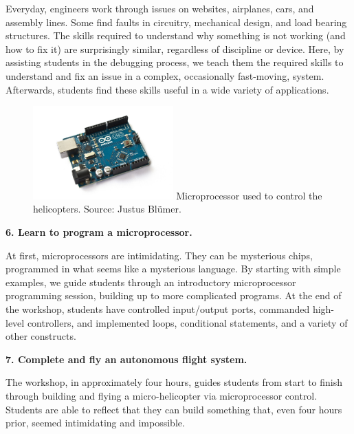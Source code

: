 \documentclass[11pt]{article}
\begin{document}
Everyday, engineers work through issues on websites, airplanes, cars, and assembly lines.  Some find faults in circuitry, mechanical design, and load bearing structures.  The skills required to understand why something is not working (and how to fix it) are surprisingly similar, regardless of discipline or device.  Here, by assisting students in the debugging process, we teach them the required skills to understand and fix an issue in a complex, occasionally fast-moving, system.  Afterwards, students find these skills useful in a wide variety of applications.

\vspace{20pt}
\begin{figure}
    \begin{center}
    \includegraphics[width=0.48\textwidth]{figures/arduino_uno.jpg}
    {\small Microprocessor used to control the helicopters.  Source: Justus Bl\"umer.}
    \end{center}
    \vspace{-30pt}
\end{figure}
\textbf{6. Learn to program a microprocessor.}

At first, microprocessors are intimidating.  They can be mysterious chips, programmed in what seems like a mysterious language.  By starting with simple examples, we guide students through an introductory microprocessor programming session, building up to more complicated programs.  At the end of the workshop, students have controlled input/output ports, commanded high-level controllers, and implemented loops, conditional statements, and a variety of other constructs. 

\newpage
\textbf{7. Complete and fly an autonomous flight system.}

The workshop, in approximately four hours, guides students from start to finish through building and flying a micro-helicopter via microprocessor control.  Students are able to reflect that they can build something that, even four hours prior, seemed intimidating and impossible.
\end{document}
